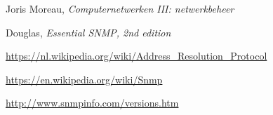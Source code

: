
\begin{thebibliography}{10}

Joris Moreau,
\emph{Computernetwerken III: netwerkbeheer}

Douglas,
\emph{Essential SNMP, 2nd edition}


\url{https://nl.wikipedia.org/wiki/Address_Resolution_Protocol}

\url{https://en.wikipedia.org/wiki/Snmp}

\url{http://www.snmpinfo.com/versions.htm}

\end{thebibliography}